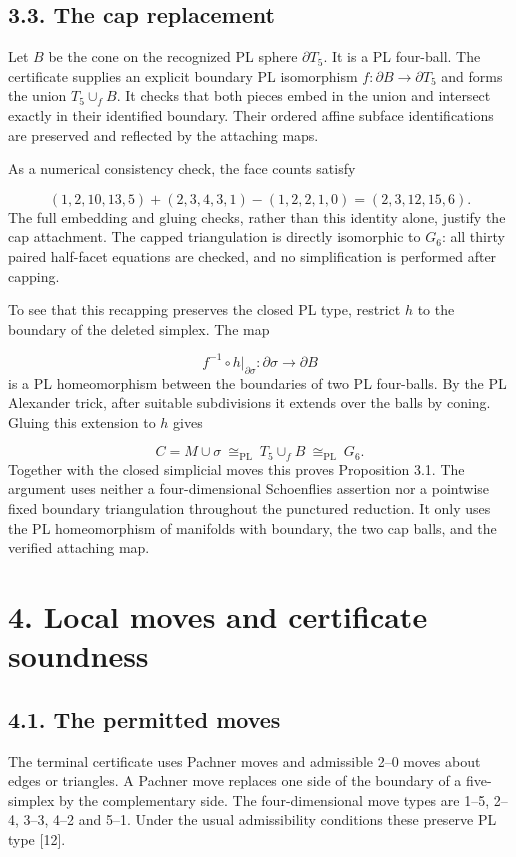 \documentclass[11pt,letterpaper]{article}
\begin{document}
\subsection*{3.3. The cap replacement}
Let $B$ be the cone on the recognized PL sphere $\partial T_5$. It is a PL four-ball. The certificate supplies an explicit boundary PL isomorphism $f:\partial B\longrightarrow\partial T_5$ and forms the union $T_5\cup_f B$. It checks that both pieces embed in the union and intersect exactly in their identified boundary. Their ordered affine subface identifications are preserved and reflected by the attaching maps.

As a numerical consistency check, the face counts satisfy

\[
(1,2,10,13,5)+(2,3,4,3,1)-(1,2,2,1,0)=(2,3,12,15,6).
\]
The full embedding and gluing checks, rather than this identity alone, justify the cap attachment. The capped triangulation is directly isomorphic to $G_6$: all thirty paired half-facet equations are checked, and no simplification is performed after capping.

To see that this recapping preserves the closed PL type, restrict $h$ to the boundary of the deleted simplex. The map

\[
f^{-1}\circ h|_{\partial\sigma}:\partial\sigma\longrightarrow\partial B
\]
is a PL homeomorphism between the boundaries of two PL four-balls. By the PL Alexander trick, after suitable subdivisions it extends over the balls by coning. Gluing this extension to $h$ gives

\[
C=M\cup\sigma\ \cong_{\mathrm{PL}}\ T_5\cup_f B\ \cong_{\mathrm{PL}}\ G_6.
\]
Together with the closed simplicial moves this proves Proposition 3.1. The argument uses neither a four-dimensional Schoenflies assertion nor a pointwise fixed boundary triangulation throughout the punctured reduction. It only uses the PL homeomorphism of manifolds with boundary, the two cap balls, and the verified attaching map.

\section*{4. Local moves and certificate soundness}
\subsection*{4.1. The permitted moves}
The terminal certificate uses Pachner moves and admissible 2--0 moves about edges or triangles. A Pachner move replaces one side of the boundary of a five-simplex by the complementary side. The four-dimensional move types are 1--5, 2--4, 3--3, 4--2 and 5--1. Under the usual admissibility conditions these preserve PL type [12].
\end{document}
